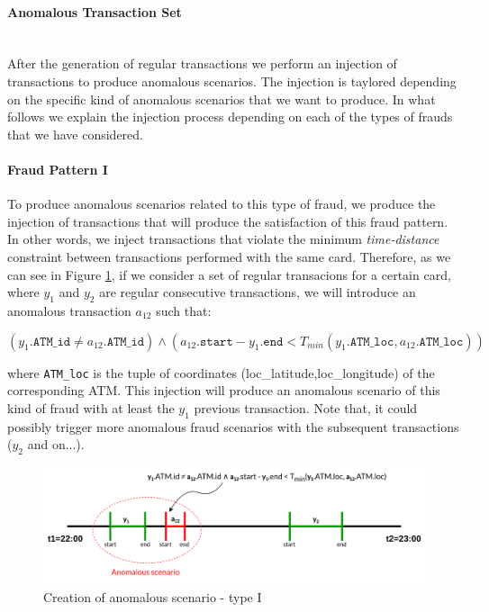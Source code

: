 \paragraph{Anomalous Transaction Set\\\\}

After the generation of regular transactions we perform an injection of transactions to produce anomalous scenarios. The injection is taylored depending on the specific kind of 
anomalous scenarios that we want to produce. In what follows we explain the injection process depending on each of the types of frauds that we have considered.

\paragraph{Fraud Pattern I}

To produce anomalous scenarios related to this type of fraud, we produce the injection
of transactions that will produce the satisfaction of this fraud pattern. In other words,
we inject transactions that violate the minimum \emph{time-distance} constraint between transactions performed with the same card. Therefore, as we can see in Figure \ref{img:anomalous-type-1}, if we consider a set of regular transacions for a certain card, where $y_1$ and $y_2$ are regular consecutive transactions, we will introduce an anomalous transaction $a_{12}$ such that: 

$$(y_1.\texttt{ATM\_id} \ne a_{12}.\texttt{ATM\_id}) \land (a_{12}.\texttt{start} - 
y_1.\texttt{end} < T_{min}(y_1.\texttt{ATM\_loc}, a_{12}.\texttt{ATM\_loc}))$$

where \texttt{ATM\_loc} is the tuple of coordinates (loc\_latitude,loc\_longitude) of the corresponding ATM. This injection will produce an anomalous scenario of this kind of fraud with at least the $y_1$ previous transaction. Note that, it could possibly trigger more anomalous fraud scenarios with the subsequent transactions ($y_2$ and on...).

\begin{figure}[H]
    \centering
    \includegraphics[width=\textwidth]{images/1-DataModel/tx-generation.png}
    \caption{Creation of anomalous scenario - type I}
    \label{img:anomalous-type-1}
\end{figure}

